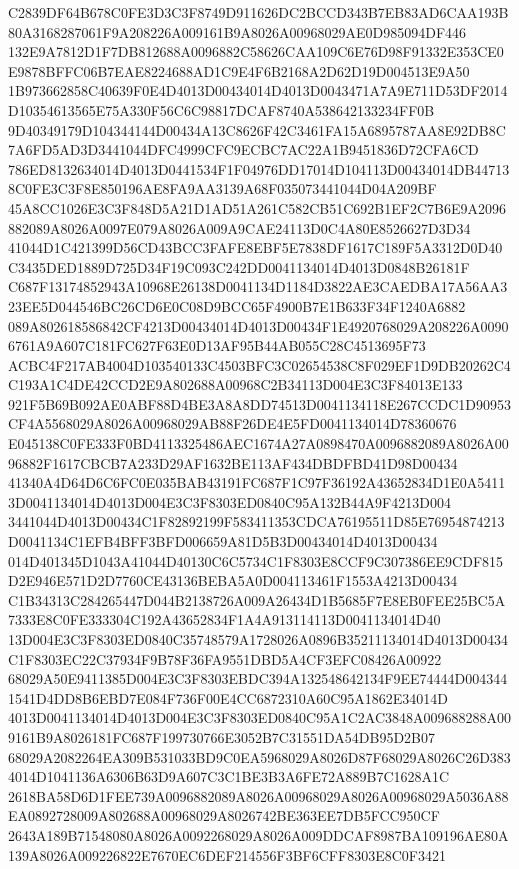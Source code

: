 \documentclass[UTF8,fontset=fandol,zihao=-4,a4paper]{ctexart}
\begin{document}
{{C2839DF64B678C0FE3D3C3F8749D911626DC2BCCD343B7EB83AD6CAA193B80A3168287061F9A208226A009161B9A8026A00968029AE0D985094DF446
132E9A7812D1F7DB812688A0096882C58626CAA109C6E76D98F91332E353CE0E9878BFFC06B7EAE8224688AD1C9E4F6B2168A2D62D19D004513E9A50
1B973662858C40639F0E4D4013D00434014D4013D0043471A7A9E711D53DF2014D10354613565E75A330F56C6C98817DCAF8740A538642133234FF0B
9D40349179D104344144D00434A13C8626F42C3461FA15A6895787AA8E92DB8C7A6FD5AD3D3441044DFC4999CFC9ECBC7AC22A1B9451836D72CFA6CD
786ED8132634014D4013D0441534F1F04976DD17014D104113D00434014DB447138C0FE3C3F8E850196AE8FA9AA3139A68F035073441044D04A209BF
45A8CC1026E3C3F848D5A21D1AD51A261C582CB51C692B1EF2C7B6E9A2096882089A8026A0097E079A8026A009A9CAE24113D0C4A80E8526627D3D34
41044D1C421399D56CD43BCC3FAFE8EBF5E7838DF1617C189F5A3312D0D40C3435DED1889D725D34F19C093C242DD0041134014D4013D0848B26181F
C687F13174852943A10968E26138D0041134D1184D3822AE3CAEDBA17A56AA323EE5D044546BC26CD6E0C08D9BCC65F4900B7E1B633F34F1240A6882
089A802618586842CF4213D00434014D4013D00434F1E4920768029A208226A00906761A9A607C181FC627F63E0D13AF95B44AB055C28C4513695F73
ACBC4F217AB4004D103540133C4503BFC3C02654538C8F029EF1D9DB20262C4C193A1C4DE42CCD2E9A802688A00968C2B34113D004E3C3F84013E133
921F5B69B092AE0ABF88D4BE3A8A8DD74513D0041134118E267CCDC1D90953CF4A5568029A8026A00968029AB88F26DE4E5FD0041134014D78360676
E045138C0FE333F0BD4113325486AEC1674A27A0898470A0096882089A8026A0096882F1617CBCB7A233D29AF1632BE113AF434DBDFBD41D98D00434
41340A4D64D6C6FC0E035BAB43191FC687F1C97F36192A43652834D1E0A54113D0041134014D4013D004E3C3F8303ED0840C95A132B44A9F4213D004
3441044D4013D00434C1F82892199F583411353CDCA76195511D85E76954874213D0041134C1EFB4BFF3BFD006659A81D5B3D00434014D4013D00434
014D401345D1043A41044D40130C6C5734C1F8303E8CCF9C307386EE9CDF815D2E946E571D2D7760CE43136BEBA5A0D004113461F1553A4213D00434
C1B34313C284265447D044B2138726A009A26434D1B5685F7E8EB0FEE25BC5A7333E8C0FE333304C192A43652834F1A4A913114113D0041134014D40
13D004E3C3F8303ED0840C35748579A1728026A0896B35211134014D4013D00434C1F8303EC22C37934F9B78F36FA9551DBD5A4CF3EFC08426A00922
68029A50E9411385D004E3C3F8303EBDC394A132548642134F9EE74444D0043441541D4DD8B6EBD7E084F736F00E4CC6872310A60C95A1862E34014D
4013D0041134014D4013D004E3C3F8303ED0840C95A1C2AC3848A009688288A009161B9A8026181FC687F199730766E3052B7C31551DA54DB95D2B07
68029A2082264EA309B531033BD9C0EA5968029A8026D87F68029A8026C26D3834014D1041136A6306B63D9A607C3C1BE3B3A6FE72A889B7C1628A1C
2618BA58D6D1FEE739A0096882089A8026A00968029A8026A00968029A5036A88EA0892728009A802688A00968029A8026742BE363EE7DB5FCC950CF
2643A189B71548080A8026A0092268029A8026A009DDCAF8987BA109196AE80A139A8026A009226822E7670EC6DEF214556F3BF6CFF8303E8C0F3421
}}
\end{document}
